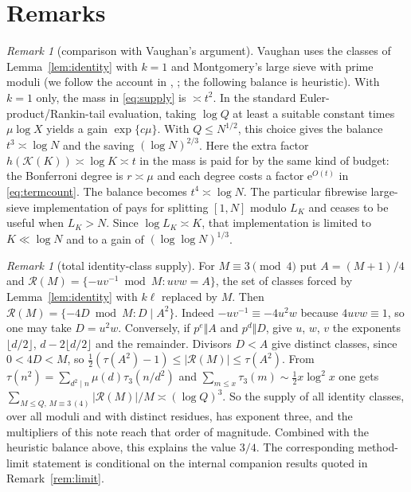 \documentclass[10pt,reqno]{amsart}
\theoremstyle{remark}
\newtheorem{remark}[theorem]{Remark}
\newcommand{\K}{\mathcal K}
\newcommand{\e}{\mathrm e}
\begin{document}
\section{Remarks}\label{sec:remarks}
\begin{remark}[comparison with Vaughan's argument]\label{rem:vaughan}
Vaughan uses the classes of Lemma~\ref{lem:identity} with $k=1$ and
Montgomery's large sieve with prime moduli (we follow the account in
\cite{PW}, \cite{LL}; the following balance is heuristic).  With $k=1$ only, the mass
in \eqref{eq:supply} is $\asymp t^2$.
In the standard Euler-product/Rankin-tail evaluation, taking $\log Q$
at least a suitable constant times $\mu\log X$ yields a gain
$\exp\{c\mu\}$.  With $Q\leq N^{1/2}$, this choice gives the balance
$t^3\asymp\log N$ and the saving $(\log N)^{2/3}$.  Here the extra factor
$h(\K(K))\asymp\log K\asymp t$
in the mass is paid for by the same kind of budget: the Bonferroni degree
is $r\asymp\mu$ and each degree costs a factor $\e^{O(t)}$ in
\eqref{eq:termcount}.  The balance becomes $t^4\asymp\log N$.  The
particular fibrewise large-sieve implementation of \cite{LL} pays for
splitting $[1,N]$ modulo $L_K$ and ceases to be useful when $L_K>N$.
Since $\log L_K\asymp K$, that implementation is limited to
$K\ll\log N$ and to a gain of $(\log\log N)^{1/3}$.
\end{remark}

\begin{remark}[total identity-class supply]\label{rem:supply}
For $M\equiv3\pmod4$ put $A=(M+1)/4$ and
$\mathcal R(M)=\{-uv^{-1}\bmod M:uvw=A\}$, the set of classes forced by
Lemma~\ref{lem:identity} with $k\ell$ replaced by $M$.  Then
$\mathcal R(M)=\{-4D\bmod M:D\mid A^2\}$.  Indeed $-uv^{-1}\equiv-4u^2w$
because $4uvw\equiv1$, so one may take $D=u^2w$.  Conversely, if
$p^e\Vert A$ and $p^d\Vert D$, give $u$, $w$, $v$ the exponents
$\lfloor d/2\rfloor$, $d-2\lfloor d/2\rfloor$ and the remainder.
Divisors $D<A$ give distinct classes, since $0<4D<M$, so
$\frac12(\tau(A^2)-1)\leq|\mathcal R(M)|\leq\tau(A^2)$.  From
$\tau(n^2)=\sum_{d^2\mid n}\mu(d)\tau_3(n/d^2)$ and
$\sum_{m\leq x}\tau_3(m)\sim\frac12x\log^2x$ one gets
$\sum_{M\leq Q,\,M\equiv3\,(4)}|\mathcal R(M)|/M\asymp(\log Q)^3$.  So the
supply of all identity classes, over all moduli and with distinct
residues, has exponent three, and the multipliers of this note reach
that order of magnitude.  Combined with the heuristic balance above, this
explains the value $3/4$.
The corresponding method-limit statement is conditional on the internal
companion results quoted in Remark~\ref{rem:limit}.
\end{remark}
\end{document}
